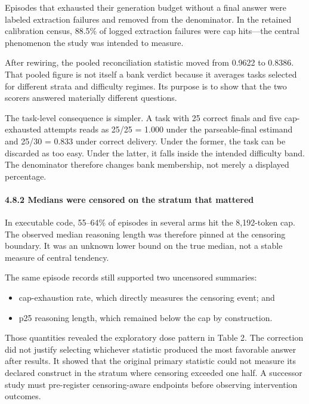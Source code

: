 \documentclass[
]{article}
\providecommand{\tightlist}{%
  \setlength{\itemsep}{0pt}\setlength{\parskip}{0pt}}
\begin{document}
Episodes that exhausted their generation budget without a final answer
were labeled extraction failures and removed from the denominator. In
the retained calibration census, 88.5\% of logged extraction failures
were cap hits---the central phenomenon the study was intended to
measure.

After rewiring, the pooled reconciliation statistic moved from 0.9622 to
0.8386. That pooled figure is not itself a bank verdict because it
averages tasks selected for different strata and difficulty regimes. Its
purpose is to show that the two scorers answered materially different
questions.

The task-level consequence is simpler. A task with 25 correct finals and
five cap-exhausted attempts reads as 25/25 = 1.000 under the
parseable-final estimand and 25/30 = 0.833 under correct delivery. Under
the former, the task can be discarded as too easy. Under the latter, it
falls inside the intended difficulty band. The denominator therefore
changes bank membership, not merely a displayed percentage.

\paragraph{4.8.2 Medians were censored on the stratum that
mattered}\label{482-medians-were-censored-on-the-stratum-that-mattered}

In executable code, 55--64\% of episodes in several arms hit the
8,192-token cap. The observed median reasoning length was therefore
pinned at the censoring boundary. It was an unknown lower bound on the
true median, not a stable measure of central tendency.

The same episode records still supported two uncensored summaries:

\begin{itemize}
\tightlist
\item
  cap-exhaustion rate, which directly measures the censoring event; and
\item
  p25 reasoning length, which remained below the cap by construction.
\end{itemize}

Those quantities revealed the exploratory dose pattern in Table 2. The
correction did not justify selecting whichever statistic produced the
most favorable answer after results. It showed that the original primary
statistic could not measure its declared construct in the stratum where
censoring exceeded one half. A successor study must pre-register
censoring-aware endpoints before observing intervention outcomes.
\end{document}

